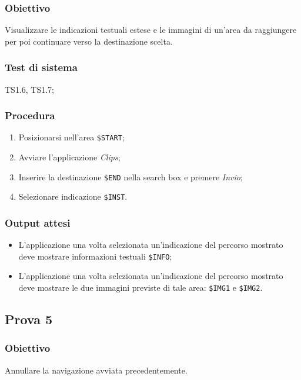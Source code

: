 \documentclass[../Sperimentazione.tex]{subfiles}
\begin{document}
	\subsubsection{Obiettivo}
		Visualizzare le indicazioni testuali estese e le immagini di un'area da raggiungere per poi continuare verso la destinazione scelta.
		
	\subsubsection{Test di sistema}
		TS1.6, TS1.7;
		
	\subsubsection{Procedura}
		\begin{enumerate}
		\item Posizionarsi nell'area  \verb|$START|;
		\item Avviare l'applicazione \textit{Clips};
		\item Inserire la destinazione  \verb|$END| nella search box e premere \textit{Invio};
		\item Selezionare indicazione  \verb|$INST|.
		\end{enumerate}

	\subsubsection{Output attesi}
		\begin{itemize}
		\item L'applicazione una volta selezionata un'indicazione del percorso mostrato deve mostrare informazioni testuali  \verb|$INFO|;
		\item L'applicazione una volta selezionata un'indicazione del percorso mostrato deve mostrare le due immagini previste di tale area:  \verb|$IMG1| e  \verb|$IMG2|.
		\end{itemize}
		
	
	
\newpage		
\subsection{Prova 5} %
\label{subsec:Prova5}
	
	\subsubsection{Obiettivo}
		Annullare la navigazione avviata precedentemente.
		
\end{document}
